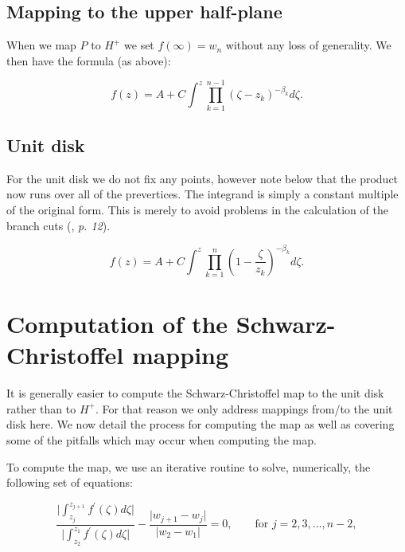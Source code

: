 \documentclass[a4paper,10pt]{amsart}
\newcommand{\sch}{Schwarz-Christoffel }
\begin{document}
\subsection{Mapping to the upper half-plane}

When we map $P$ to $H^+$ we set $f(\infty) = w_n$ without any loss of generality. We then have the formula (as above):

\begin{equation}
f(z) = A + C \int^z \prod_{k=1}^{n-1} (\zeta-z_k)^{-\beta_k} d\zeta.
\end{equation}



\subsection{Unit disk}

For the unit disk we do not fix any points, however note below that the product now runs over all of the prevertices. The integrand is simply a constant multiple of the original form. This is merely to avoid problems in the calculation of the branch cuts (\cite{driscoll}, \emph{p. 12}).

\begin{equation}
\label{unitscmap}
f(z) = A + C \int^z \prod_{k=1}^{n} (1 - \frac{\zeta}{z_k})^{-\beta_k} d\zeta.
\end{equation}






\section{Computation of the \sch mapping}

It is generally easier to compute the \sch map to the unit disk rather than to $H^+$. For that reason we only address mappings from/to the unit disk here. We now detail the process for computing the map as well as covering some of the pitfalls which may occur when computing the map.

To compute the map, we use an iterative routine to solve, numerically, the following set of equations:

\begin{equation}
\label{optimizeme}
\frac{\vert \int_{z_j}^{z_{j+1}} f^\prime(\zeta) d\zeta \vert}{\vert \int_{z_2}^{z_{1}} f^\prime(\zeta) d\zeta\vert} - \frac{\vert w_{j+1} - w_j\vert}{\vert w_2 - w_1\vert} = 0, \qquad \text{for } j=2,3,\dots,n-2,
\end{equation}
\end{document}
